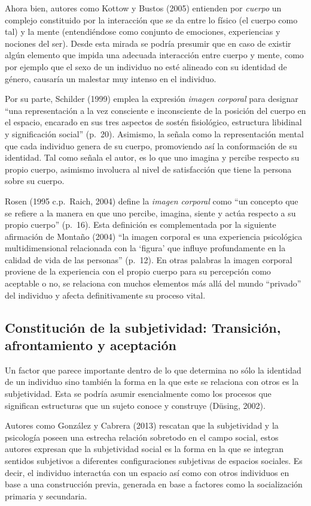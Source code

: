 Ahora bien, autores como Kottow y Bustos (2005) entienden por \emph{cuerpo}  un
complejo constituido por la interacción que se da entre lo físico (el cuerpo
como tal) y la mente (entendiéndose como conjunto de emociones, experiencias y
nociones del ser).
Desde esta mirada se podría presumir que en caso de existir algún elemento que
impida una adecuada interacción entre cuerpo y mente, como por ejemplo que el
sexo de un individuo no esté alineado con su identidad de género, causaría un
malestar muy intenso en el individuo.

Por su parte, Schilder (1999) emplea la expresión \emph{imagen corporal} para designar
“una representación a la vez consciente e inconsciente de la posición del cuerpo
en el espacio, encarado en sus tres aspectos de sostén fisiológico, estructura
libidinal y significación social” (p.~20).
Asimismo, la señala como la representación  mental que cada individuo genera de
su cuerpo, promoviendo así la conformación de su identidad.
Tal como señala el autor, es lo que uno imagina y percibe respecto su propio
cuerpo, asimismo involucra al nivel de satisfacción que tiene la persona sobre
su cuerpo.

Rosen (1995 c.p.~Raich, 2004) define la \emph{imagen corporal} como “un concepto que
se refiere a la manera en que uno percibe, imagina, siente y actúa respecto a su
propio cuerpo” (p.~16).
Esta definición es complementada por la siguiente afirmación de Montaño (2004)
“la imagen corporal es una experiencia psicológica multidimensional relacionada
con la ‘figura’ que influye profundamente en la calidad de vida de las
personas” (p.~12).
En otras palabras la imagen corporal proviene de la experiencia con el propio
cuerpo para su percepción como aceptable o no, se relaciona con muchos elementos
más allá del mundo “privado” del individuo y afecta definitivamente su proceso
vital.

\subsection[Constitución de la subjetividad]{Constitución de la subjetividad: Transición, afrontamiento y
aceptación}
Un factor que parece importante dentro de lo que determina no sólo la identidad
de un individuo sino también la forma en la que este se relaciona con otros es
la subjetividad.
Esta se podría asumir esencialmente como los procesos que significan
estructuras que un sujeto conoce y construye (Düsing, 2002).

Autores como González y Cabrera (2013) rescatan que la subjetividad y la
psicología poseen una estrecha relación sobretodo en el campo social, estos
autores expresan que la subjetividad social es la forma en la que se integran
sentidos subjetivos a diferentes configuraciones subjetivas de espacios
sociales.
Es decir, el individuo interactúa con un espacio así como con otros individuos
en base a una construcción previa, generada en base a factores como la
socialización primaria y secundaria.

